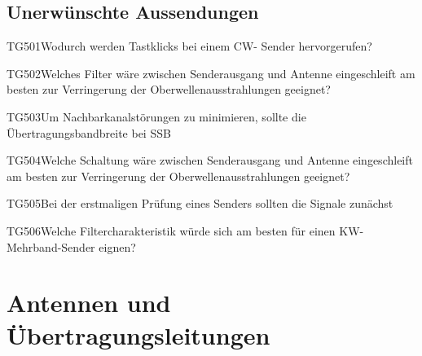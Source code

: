 \subsection{Unerwünschte Aussendungen}

\begin{question}{TG501}{Wodurch werden Tastklicks bei einem CW- Sender hervorgerufen?}
\end{question}

\begin{question}{TG502}{Welches Filter wäre zwischen Senderausgang und Antenne eingeschleift am besten zur Verringerung der Oberwellenausstrahlungen geeignet?}
\end{question}

\begin{question}{TG503}{Um Nachbarkanalstörungen zu minimieren, sollte die Übertragungsbandbreite bei SSB}
\end{question}

\begin{question}{TG504}{Welche Schaltung wäre zwischen Senderausgang und Antenne eingeschleift am besten zur Verringerung der Oberwellenausstrahlungen geeignet?}
\end{question}

\begin{question}{TG505}{Bei der erstmaligen Prüfung eines Senders sollten die Signale zunächst}
\end{question}

\begin{question}{TG506}{Welche Filtercharakteristik würde sich am besten für einen KW-Mehrband-Sender eignen?}
\end{question}

\section{Antennen und Übertragungsleitungen}

